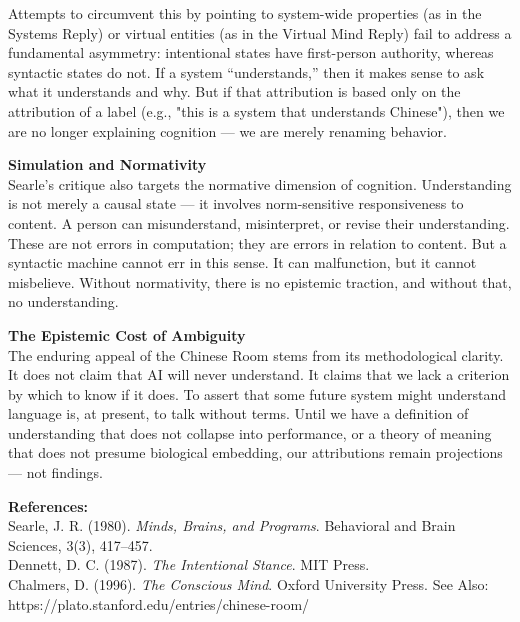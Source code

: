 \begin{technical}
Attempts to circumvent this by pointing to system-wide properties (as in the Systems Reply) or virtual entities (as in the Virtual Mind Reply) fail to address a fundamental asymmetry: intentional states have first-person authority, whereas syntactic states do not. If a system “understands,” then it makes sense to ask what it understands and why. But if that attribution is based only on the attribution of a label (e.g., "this is a system that understands Chinese"), then we are no longer explaining cognition — we are merely renaming behavior.

\noindent\textbf{Simulation and Normativity}\\[0.5em]
Searle’s critique also targets the normative dimension of cognition. Understanding is not merely a causal state — it involves norm-sensitive responsiveness to content. A person can misunderstand, misinterpret, or revise their understanding. These are not errors in computation; they are errors in relation to content. But a syntactic machine cannot err in this sense. It can malfunction, but it cannot misbelieve. Without normativity, there is no epistemic traction, and without that, no understanding.

\noindent\textbf{The Epistemic Cost of Ambiguity}\\[0.5em]
The enduring appeal of the Chinese Room stems from its methodological clarity. It does not claim that AI will never understand. It claims that we lack a criterion by which to know if it does. To assert that some future system might understand language is, at present, to talk without terms. Until we have a definition of understanding that does not collapse into performance, or a theory of meaning that does not presume biological embedding, our attributions remain projections — not findings.

\vspace{0.5em}
\noindent\textbf{References:}\\
Searle, J. R. (1980). \textit{Minds, Brains, and Programs}. Behavioral and Brain Sciences, 3(3), 417–457.\\
Dennett, D. C. (1987). \textit{The Intentional Stance}. MIT Press.\\
Chalmers, D. (1996). \textit{The Conscious Mind}. Oxford University Press.
See Also: https://plato.stanford.edu/entries/chinese-room/
\end{technical}
